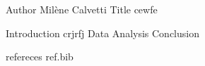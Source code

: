 Author Milène Calvetti 
Title cewfe

Introduction crjrfj  
Data 
Analysis
Conclusion

refereces 
ref.bib


